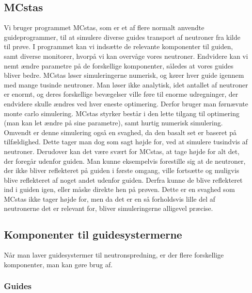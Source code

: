\documentclass[12pt,oneside,a4paper]{article}
\begin{document}
{{{{{\subsection{MCstas}
Vi bruger programmet MCstas, som er et af flere normalt anvendte guideprogrammer, til at simulere diverse guides transport af neutroner fra kilde til prøve. I programmet kan vi indsætte de relevante komponenter til guiden, samt diverse monitorer, hvorpå vi kan overvåge vores neutroner. Endvidere kan vi nemt ændre parametre på de forskellige komponenter, således at vores guides bliver bedre. MCstas løser simuleringerne numerisk, og kører hver guide igennem med mange tusinde neutroner. Man løser ikke analytisk, idet antallet af neutroner er enormt, og deres forskellige bevægelser ville føre til enorme udregninger, der endvidere skulle ændres ved hver eneste optimering. Derfor bruger man førnævnte monte carlo simulering. MCstas styrker består i den lette tilgang til optimering (man kan let ændre på sine parametre), samt hurtig numerisk simulering. Omvendt er denne simulering også en svaghed, da den basalt set er baseret på tilfældighed. Dette tager man dog som sagt højde for, ved at simulere tusindvis af neutroner. Derudover kan det være svært for MCstas, at tage højde for alt det, der foregår udenfor guiden. Man kunne eksempelvis forestille sig at de neutroner, der ikke bliver reflekteret på guiden i første omgang, ville fortsætte og muligvis blive reflekteret af noget andet udenfor guiden. Derfra kunne de blive reflekteret ind i guiden igen, eller måske direkte hen på prøven. Dette er en svaghed som MCstas ikke tager højde for, men da det er en så forholdsvis lille del af neutronerne det er relevant for, bliver simuleringerne alligevel præcise.


\subsection{Komponenter til guidesystermerne}
Når man laver guidesystermer til neutronspredning, er der flere forskellige komponenter, man kan gøre brug af.

\subsubsection{Guides}

}}}}}
\end{document}
